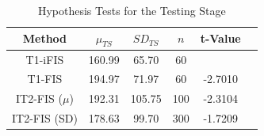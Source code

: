 \documentclass[conference]{IEEEtran}
\begin{document}
\begin{table}[!t]
  \renewcommand{\arraystretch}{1.3}
  \caption{Hypothesis Tests for the Testing Stage}
  \label{hypothesis-tests}
  \centering
  \begin{tabular}{|c|c|c|c|c|c|}
    \hline
    Method & $\mu_{TS}$ & $SD_{TS}$ & $n$ & t-Value\\
    \hline
    T1-iFIS & 160.99 & 65.70 & 60 & \\
    \hline
    T1-FIS & 194.97 & 71.97 & 60 & -2.7010 \\
    \hline
    IT2-FIS (\(\mu\)) & 192.31 & 105.75 & 100 & -2.3104 \\
    \hline
    IT2-FIS (SD) & 178.63 & 99.70 & 300 & -1.7209 \\
    \hline
  \end{tabular}
\end{table}

% 
% 


% 
\end{document}
